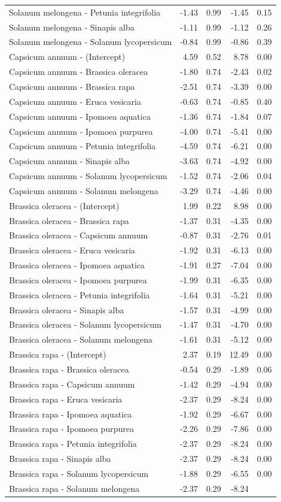 \documentclass[
  12pt,
]{article}
\begin{document}
\begin{longtable}[]{@{}lrrrr@{}}
Solanum melongena - Petunia integrifolia & -1.43 & 0.99 & -1.45 &
0.15\tabularnewline
Solanum melongena - Sinapis alba & -1.11 & 0.99 & -1.12 &
0.26\tabularnewline
Solanum melongena - Solanum lycopersicum & -0.84 & 0.99 & -0.86 &
0.39\tabularnewline
Capsicum annuum - (Intercept) & 4.59 & 0.52 & 8.78 & 0.00\tabularnewline
Capsicum annuum - Brassica oleracea & -1.80 & 0.74 & -2.43 &
0.02\tabularnewline
Capsicum annuum - Brassica rapa & -2.51 & 0.74 & -3.39 &
0.00\tabularnewline
Capsicum annuum - Eruca vesicaria & -0.63 & 0.74 & -0.85 &
0.40\tabularnewline
Capsicum annuum - Ipomoea aquatica & -1.36 & 0.74 & -1.84 &
0.07\tabularnewline
Capsicum annuum - Ipomoea purpurea & -4.00 & 0.74 & -5.41 &
0.00\tabularnewline
Capsicum annuum - Petunia integrifolia & -4.59 & 0.74 & -6.21 &
0.00\tabularnewline
Capsicum annuum - Sinapis alba & -3.63 & 0.74 & -4.92 &
0.00\tabularnewline
Capsicum annuum - Solanum lycopersicum & -1.52 & 0.74 & -2.06 &
0.04\tabularnewline
Capsicum annuum - Solanum melongena & -3.29 & 0.74 & -4.46 &
0.00\tabularnewline
Brassica oleracea - (Intercept) & 1.99 & 0.22 & 8.98 &
0.00\tabularnewline
Brassica oleracea - Brassica rapa & -1.37 & 0.31 & -4.35 &
0.00\tabularnewline
Brassica oleracea - Capsicum annuum & -0.87 & 0.31 & -2.76 &
0.01\tabularnewline
Brassica oleracea - Eruca vesicaria & -1.92 & 0.31 & -6.13 &
0.00\tabularnewline
Brassica oleracea - Ipomoea aquatica & -1.91 & 0.27 & -7.04 &
0.00\tabularnewline
Brassica oleracea - Ipomoea purpurea & -1.99 & 0.31 & -6.35 &
0.00\tabularnewline
Brassica oleracea - Petunia integrifolia & -1.64 & 0.31 & -5.21 &
0.00\tabularnewline
Brassica oleracea - Sinapis alba & -1.57 & 0.31 & -4.99 &
0.00\tabularnewline
Brassica oleracea - Solanum lycopersicum & -1.47 & 0.31 & -4.70 &
0.00\tabularnewline
Brassica oleracea - Solanum melongena & -1.61 & 0.31 & -5.12 &
0.00\tabularnewline
Brassica rapa - (Intercept) & 2.37 & 0.19 & 12.49 & 0.00\tabularnewline
Brassica rapa - Brassica oleracea & -0.54 & 0.29 & -1.89 &
0.06\tabularnewline
Brassica rapa - Capsicum annuum & -1.42 & 0.29 & -4.94 &
0.00\tabularnewline
Brassica rapa - Eruca vesicaria & -2.37 & 0.29 & -8.24 &
0.00\tabularnewline
Brassica rapa - Ipomoea aquatica & -1.92 & 0.29 & -6.67 &
0.00\tabularnewline
Brassica rapa - Ipomoea purpurea & -2.26 & 0.29 & -7.86 &
0.00\tabularnewline
Brassica rapa - Petunia integrifolia & -2.37 & 0.29 & -8.24 &
0.00\tabularnewline
Brassica rapa - Sinapis alba & -2.37 & 0.29 & -8.24 &
0.00\tabularnewline
Brassica rapa - Solanum lycopersicum & -1.88 & 0.29 & -6.55 &
0.00\tabularnewline
Brassica rapa - Solanum melongena & -2.37 & 0.29 & -8.24 &

\end{longtable}
\end{document}
